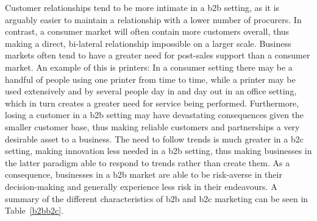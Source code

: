 Customer relationships tend to be more intimate in a \gls{b2b} setting, as it is arguably easier to maintain a relationship with a lower number of procurers. In contrast, a consumer market will often contain more customers overall, thus making a direct, bi-lateral relationship impossible on a larger scale. Business markets often tend to have a greater need for post-sales support than a consumer market. An example of this is printers: In a consumer setting there may be a handful of people using one printer from time to time, while a printer may be used extensively and by several people day in and day out in an office setting, which in turn creates a greater need for service being performed. Furthermore, losing a customer in a \gls{b2b} setting may have devastating consequences given the smaller customer base, thus making reliable customers and partnerships a very desirable asset to a business. The need to follow trends is much greater in a \gls{b2c} setting, making innovation less needed in a \gls{b2b} setting, thus making businesses in the latter paradigm able to respond to trends rather than create them. As a consequence, businesses in a \gls{b2b} market are able to be risk-averse in their decision-making and generally experience less risk in their endeavours. A summary of the different characteristics of \gls{b2b} and \gls{b2c} marketing can be seen in Table~\ref{b2bb2c}.


